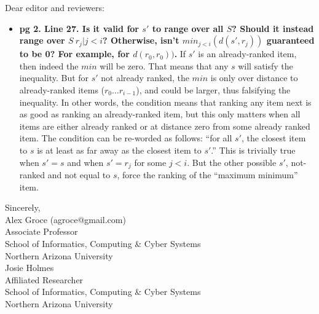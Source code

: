 \documentclass{letter}
\begin{document}
\begin{letter}{}

  \address{Alex Groce\\School of Informatics, Computing \& Cyber Systems\\Northern Arizona University}

  \opening{Dear editor and reviewers:}



\begin{itemize}
\item {\bf pg 2. Line 27. Is it valid for $s'$ to range over all $S$? Should it instead range over $S \ { r_j | j < i }$? Otherwise, isn't $min_{j<i}(d(s', r_j))$ guaranteed to be 0? For example, for $d(r_0, r_0))$.}  If $s'$ is an already-ranked item, then indeed the $min$ will be zero.  That means that any $s$ will satisfy the inequality.  But for $s'$ not already ranked, the $min$ is only over distance to already-ranked items ($r_0 \ldots r_{i-1}$), and could be larger, thus falsifying the inequality.  In other words, the condition means that ranking any item next is as good as ranking an already-ranked item, but this only matters when all items are either already ranked or at distance zero from some already ranked item.  The condition can be re-worded as follows:  ``for all $s'$, the closest item to $s$ is at least as far away as the closest item to $s'$.''  This is trivially true when $s' = s$ and when $s' = r_j$ for some $j<i$.  But the other possible $s'$, not-ranked and not equal to $s$, force the ranking of the ``maximum minimum'' item.
\end{itemize}

  \closing{Sincerely,\\Alex Groce (agroce@gmail.com)\\Associate
    Professor\\
    School of Informatics, Computing \& Cyber Systems\\Northern
    Arizona University \vspace{0.1in}\\Josie Holmes\\Affiliated Researcher\\
    School of Informatics, Computing \& Cyber Systems\\Northern Arizona University}

\end{letter}
\end{document}
